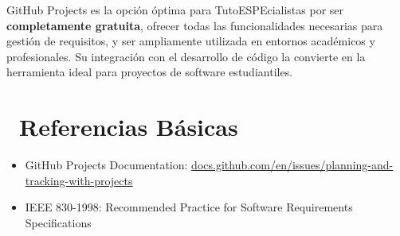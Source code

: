 \documentclass[12pt,a4paper]{article}
\begin{document}
\begin{tcolorbox}[colback=lightblue!15, colframe=headercolor, rounded corners, boxrule=2pt, title=\faAward\ Decisión Final]
GitHub Projects es la opción óptima para TutoESPEcialistas por ser \textbf{completamente gratuita}, ofrecer todas las funcionalidades necesarias para gestión de requisitos, y ser ampliamente utilizada en entornos académicos y profesionales. Su integración con el desarrollo de código la convierte en la herramienta ideal para proyectos de software estudiantiles.
\end{tcolorbox}

\section{\faBook\ Referencias Básicas}

\begin{tcolorbox}[colback=gray!5, colframe=gray, rounded corners, boxrule=1pt]
\begin{itemize}[itemsep=0.3em]
    \item GitHub Projects Documentation: \href{https://docs.github.com/en/issues/planning-and-tracking-with-projects}{docs.github.com/en/issues/planning-and-tracking-with-projects}
    \item IEEE 830-1998: Recommended Practice for Software Requirements Specifications
\end{itemize}
\end{tcolorbox}
\end{document}
